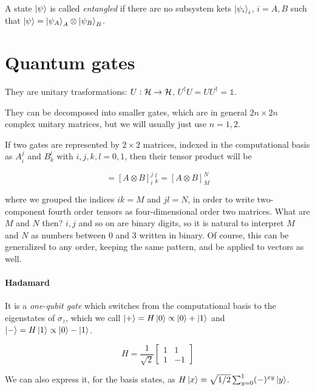 \documentclass[main.tex]{subfiles}
\begin{document}
A state \(\ket{\psi } \) is called \emph{entangled} if there are no subsystem kets \(\ket{\psi _i} _i\), \(i = A, B\) such that \(\ket{\psi } = \ket{\psi _A} _A \otimes \ket{\psi _B} _B\).

\section{Quantum gates}
They are unitary trasformations: \(U: \mathcal{H} \rightarrow \mathcal{H}\), \(U ^\dag U = UU^\dag= \mathbb{1}\).

They can be decomposed into smaller gates, which are in general \(2n \times 2n\) complex unitary matrices, but we will usually just use \(n=1, 2\).

If two gates are represented by \(2 \times 2\) matrices, indexed in the computational basis as \(A_i ^j\) and \(B_k^l\) with \(i, j, k, l = 0,1\),  then their tensor product will be

\begin{equation}
    [A_i^j B_k^l] = [A \otimes B]_i^j\,_k^l = [A \otimes B ] _M ^N
\end{equation}

where we grouped the indices \(ik = M\) and \(jl=N\), in order to write two-component fourth order tensors as four-dimensional order two matrices. What are \(M\) and \(N\)  then? \(i, j\) and so on are binary digits, so it is natural to interpret \(M\) and \(N\) as numbers between \(0\) and \(3\) written in binary.
Of course, this can be generalized to any order, keeping the same pattern, and be applied to vectors as well.

\paragraph{Hadamard} \label{par:hadamard}
It is a \emph{one-qubit gate} which switches from the computational basis to the eigenstates of \(\sigma_z\), which we call \(\ket{+} = H \ket{0} \propto \ket{0} +\ket{1}   \) and \(\ket{-} = H \ket{1} \propto \ket{0} - \ket{1} \).

\begin{equation}
    H = \frac{1}{\sqrt{2} } \begin{bmatrix}
    1   & 1 \\
    1   & -1
\end{bmatrix}
\end{equation}

We can also express it, for the basis states, as \(H \ket{x} = \sqrt{1/2} \sum _{y=0}^1 (-)^{xy} \ket{y}  \).
\end{document}
